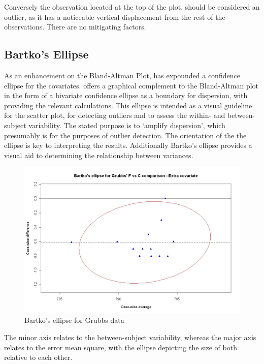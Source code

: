 \documentclass[12pt, a4paper]{report}
\theoremstyle{plain}
\theoremstyle{definition}
\theoremstyle{remark}
\begin{document}
Conversely the observation located at the top of the plot, should be considered an outlier, as it has a noticeable vertical displacement from the rest of the observations. There are no mitigating factors.

\subsection{Bartko's Ellipse}

As an enhancement on the Bland-Altman Plot, \citet{Bartko} has
expounded a confidence ellipse for the covariates. \citet{Bartko} offers a graphical complement to the Bland-Altman
plot in the form of a bivariate confidence ellipse as a boundary for dispersion, with \citet{AltmanEllipse} providing the relevant calculations. This ellipse is intended as a visual guideline for the scatter plot, for detecting outliers and to assess the within- and between-subject variability. The stated purpose is to `amplify dispersion', which presumably is for the purposes of outlier detection. The orientation of the the ellipse is key to interpreting the results. Additionally Bartko's ellipse provides a visual aid to determining the relationship between variances. 
\begin{center}
\begin{figure}[h!]
	\includegraphics[width=130mm]{images/GrubbsBartko2.jpeg}
	\caption{Bartko's ellipse for Grubbs data}\label{GrubbsBartko2}
\end{figure}
\end{center}
The minor axis relates to the between-subject variability, whereas the major axis relates to the error mean square, with the ellipse depicting the size of both relative to each other.
\end{document}

